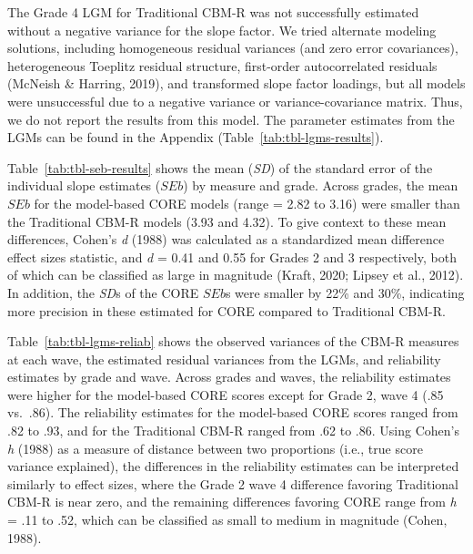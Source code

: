 \documentclass[
  english,
  man, fleqn, noextraspace]{apa6}
\begin{document}
The Grade 4 LGM for Traditional CBM-R was not successfully estimated without a negative variance for the slope factor. We tried alternate modeling solutions, including homogeneous residual variances (and zero error covariances), heterogeneous Toeplitz residual structure, first-order autocorrelated residuals (McNeish \& Harring, 2019), and transformed slope factor loadings, but all models were unsuccessful due to a negative variance or variance-covariance matrix. Thus, we do not report the results from this model. The parameter estimates from the LGMs can be found in the Appendix (Table~\ref{tab:tbl-lgms-results}).

Table~\ref{tab:tbl-seb-results} shows the mean (\emph{SD}) of the standard error of the individual slope estimates (\(SEb\)) by measure and grade. Across grades, the mean \(SEb\) for the model-based CORE models (range = 2.82 to 3.16) were smaller than the Traditional CBM-R models (3.93 and 4.32). To give context to these mean differences, Cohen's \emph{d} (1988) was calculated as a standardized mean difference effect sizes statistic, and \emph{d} = 0.41 and 0.55 for Grades 2 and 3 respectively, both of which can be classified as large in magnitude (Kraft, 2020; Lipsey et al., 2012). In addition, the \emph{SD}s of the CORE \(SEb\)s were smaller by 22\% and 30\%, indicating more precision in these estimated for CORE compared to Traditional CBM-R.

Table~\ref{tab:tbl-lgms-reliab} shows the observed variances of the CBM-R measures at each wave, the estimated residual variances from the LGMs, and reliability estimates by grade and wave. Across grades and waves, the reliability estimates were higher for the model-based CORE scores except for Grade 2, wave 4 (.85 vs.~.86). The reliability estimates for the model-based CORE scores ranged from .82 to .93, and for the Traditional CBM-R ranged from .62 to .86. Using Cohen's \emph{h} (1988) as a measure of distance between two proportions (i.e., true score variance explained), the differences in the reliability estimates can be interpreted similarly to effect sizes, where the Grade 2 wave 4 difference favoring Traditional CBM-R is near zero, and the remaining differences favoring CORE range from \emph{h} = .11 to .52, which can be classified as small to medium in magnitude (Cohen, 1988).
\end{document}
